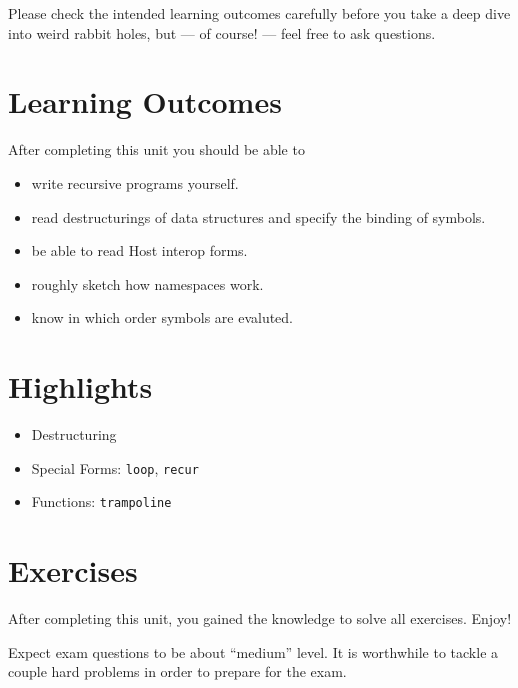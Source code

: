 \documentclass[11pt,a4paper]{article}
\begin{document}
Please check the intended learning outcomes carefully before you take a deep dive into weird rabbit holes,
but --- of course! --- feel free to ask questions.

\section{Learning Outcomes}

After completing this unit you should be able to

\begin{itemize}
    \item write recursive programs yourself.
    \item read destructurings of data structures and specify the binding of symbols.
    \item be able to read Host interop forms.
    \item roughly sketch how namespaces work.
    \item know in which order symbols are evaluted.
\end{itemize}

\section{Highlights}

\begin{itemize}
    \item Destructuring
    \item Special Forms: \verb|loop|, \verb|recur|
    \item Functions: \verb|trampoline|
\end{itemize}



\section{Exercises}

\begin{exercise}
    After completing this unit, you gained the knowledge to solve all exercises. Enjoy!

    Expect exam questions to be about ``medium'' level.
    It is worthwhile to tackle a couple hard problems 
    in order to prepare for the exam.
\end{exercise}
\end{document}
